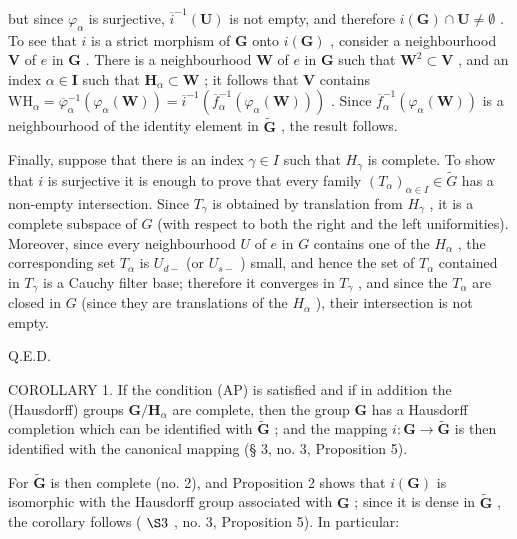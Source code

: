but since \(\varphi_{\alpha}\) is surjective, \(\overline{i}^{-1}(\mathbf{U})\) is not empty, and therefore \(i(\mathbf{G}) \cap \mathbf{U} \neq \emptyset\) . To see that \(i\) is a strict morphism of \(\mathbf{G}\) onto \(i(\mathbf{G})\) , consider a neighbourhood \(\mathbf{V}\) of \(e\) in \(\mathbf{G}\) . There is a neighbourhood \(\mathbf{W}\) of \(e\) in \(\mathbf{G}\) such that \(\mathbf{W}^2 \subset \mathbf{V}\) , and an index \(\alpha \in \mathbf{I}\) such that \(\mathbf{H}_{\alpha} \subset \mathbf{W}\) ; it follows that \(\mathbf{V}\) contains \(\mathrm{WH}_{\alpha} = \overline{\varphi}_{\alpha}^{-1}(\varphi_{\alpha}(\mathbf{W})) = \overline{i}^{-1}(\overline{f}_{\alpha}^{-1}(\varphi_{\alpha}(\mathbf{W})))\) . Since \(\overline{f}_{\alpha}^{-1}(\varphi_{\alpha}(\mathbf{W}))\) is a neighbourhood of the identity element in \(\tilde{\mathbf{G}}\) , the result follows.

Finally, suppose that there is an index \(\gamma \in I\) such that \(H_{\gamma}\) is complete. To show that \(i\) is surjective it is enough to prove that every family \((T_{\alpha})_{\alpha \in I} \in \tilde{G}\) has a non-empty intersection. Since \(T_{\gamma}\) is obtained by translation from \(H_{\gamma}\) , it is a complete subspace of \(G\) (with respect to both the right and the left uniformities). Moreover, since every neighbourhood \(U\) of \(e\) in \(G\) contains one of the \(H_{\alpha}\) , the corresponding set \(T_{\alpha}\) is \(U_{d-}\) (or \(U_{s-}\) ) small, and hence the set of \(T_{\alpha}\) contained in \(T_{\gamma}\) is a Cauchy filter base; therefore it converges in \(T_{\gamma}\) , and since the \(T_{\alpha}\) are closed in \(G\) (since they are translations of the \(H_{\alpha}\) ), their intersection is not empty.

Q.E.D.

COROLLARY 1. If the condition (AP) is satisfied and if in addition the (Hausdorff) groups \(\mathbf{G} / \mathbf{H}_{\alpha}\) are complete, then the group \(\mathbf{G}\) has a Hausdorff completion which can be identified with \(\tilde{\mathbf{G}}\) ; and the mapping \(i: \mathbf{G} \to \tilde{\mathbf{G}}\) is then identified with the canonical mapping (§ 3, no. 3, Proposition 5).

For \(\tilde{\mathbf{G}}\) is then complete (no. 2), and Proposition 2 shows that \(i(\mathbf{G})\) is isomorphic with the Hausdorff group associated with \(\mathbf{G}\) ; since it is dense in \(\tilde{\mathbf{G}}\) , the corollary follows ( \(\S 3\) , no. 3, Proposition 5). In particular:

